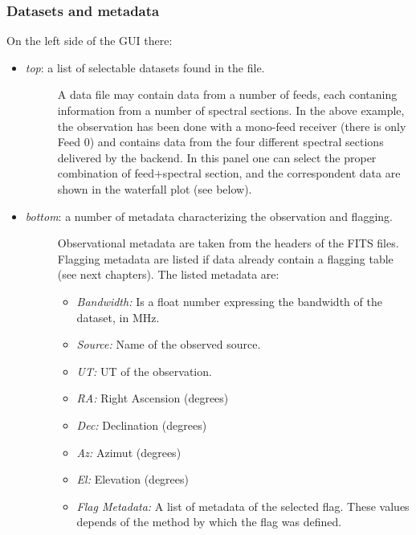 \documentclass[letterpaper,10pt,english]{sphinxmanual}
\begin{document}
\subsubsection{Datasets and metadata}
\label{gui:datasets-and-metadata}
On the left side of the GUI there:
\begin{itemize}
\item {} \begin{description}
\item[{\emph{top}: a list of selectable datasets found in the file.}] \leavevmode
A data file may contain data from a number of feeds, each contaning information from a number of spectral sections.
In the above example, the observation has been done with a mono-feed receiver (there is only Feed 0) and contains data from the four different spectral sections delivered by the backend.
In this panel one can select the proper combination of feed+spectral section, and the correspondent
data are shown in the waterfall plot (see below).

\end{description}

\item {} \begin{description}
\item[{\emph{bottom}: a number of metadata characterizing the observation and flagging.}] \leavevmode
Observational metadata are taken from the headers of the FITS files.
Flagging metadata are listed if data already contain a flagging table (see next chapters).
The listed metadata are:
\begin{itemize}
\item {} 
\emph{Bandwidth:} Is a float number expressing the bandwidth of the dataset, in MHz.

\item {} 
\emph{Source:} Name of the observed source.

\item {} 
\emph{UT:} UT of the observation.

\item {} 
\emph{RA:} Right Ascension (degrees)

\item {} 
\emph{Dec:} Declination (degrees)

\item {} 
\emph{Az:} Azimut (degrees)

\item {} 
\emph{El:} Elevation (degrees)

\item {} 
\emph{Flag Metadata:} A list of metadata of the selected flag. These values depends of the method by which the flag was defined.

\end{itemize}

\end{description}

\end{itemize}
\end{document}
